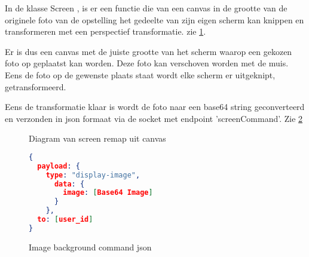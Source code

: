 



In de klasse Screen , is er een functie die van een canvas in de grootte van de originele foto van de opstelling het gedeelte van zijn eigen scherm kan knippen en transformeren met een perspectief transformatie. zie \ref{remapDiagram}.

Er is dus een canvas met de juiste grootte van het scherm waarop een gekozen foto op geplaatst kan worden. Deze foto kan verschoven worden met de muis. Eens de foto op de gewenste plaats staat wordt elke scherm er uitgeknipt, getransformeerd.

Eens de transformatie klaar is wordt de foto naar een base64 string geconverteerd en verzonden in json formaat via de socket met endpoint 'screenCommand'. Zie \ref{json}

\vspace{30px}

\begin{figure}
\caption{Diagram van screen remap uit canvas} \label{remapDiagram}
\end{figure}

\begin{figure}
\begin{lstlisting}[language=json,firstnumber=1]
{
  payload: {
    type: "display-image",
      data: {
        image: [Base64 Image]
      }
    },
  to: [user_id]
}
\end{lstlisting}
\caption{Image background command json} \label{json}
\end{figure}


